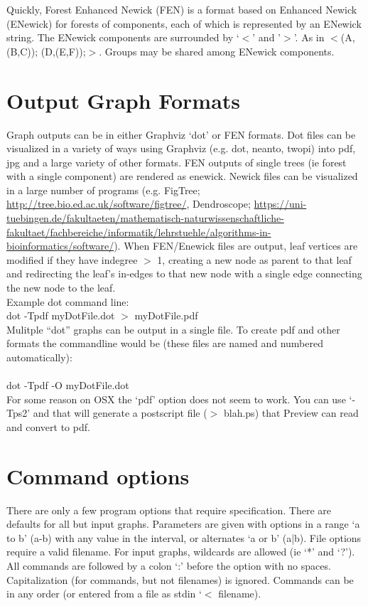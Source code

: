 \documentclass[11pt]{memoir}
\begin{document}
	Quickly, Forest Enhanced Newick (FEN) is a format based on Enhanced Newick (ENewick) for forests of components, each
	of which is represented by an ENewick string.  The ENewick components are surrounded by `$<$' and '$>$'.
	As in $<$(A, (B,C)); (D,(E,F));$>$.  Groups may be shared among ENewick components.
	
	
	\section{Output Graph Formats}
	Graph outputs can be in either Graphviz `dot' or FEN formats.  Dot files can be visualized in a variety of ways 
	using Graphviz (e.g. dot, neanto, twopi) into pdf, jpg and a large variety of other formats. FEN outputs of 
	single trees (ie forest with a single component) are rendered as enewick.  Newick files can be visualized in a 
	large number of programs (e.g. FigTree; \url{http://tree.bio.ed.ac.uk/software/figtree/}, Dendroscope; 
	\url{https://uni-tuebingen.de/fakultaeten/mathematisch-naturwissenschaftliche-fakultaet/fachbereiche/informatik/lehrstuehle/algorithms-in-bioinformatics/software/}). 	
	When FEN/Enewick files are output, leaf vertices are modified if they have indegree $>$ 1, creating a new node as parent to that leaf
	and redirecting the leaf's in-edges to that new node with a single edge connecting the new node to the leaf.  
	\bigskip
	\\Example dot command line: \\dot -Tpdf myDotFile.dot $>$ myDotFile.pdf\\
	
	Mulitple ``dot'' graphs can be output in a single file.  To create pdf and 
	other formats the commandline would be (these files are named and numbered automatically):\\\\dot -Tpdf -O myDotFile.dot\\
	
	For some reason on OSX the `pdf' option does not seem to work.  You can use `-Tps2' and that will generate a postscript file ($>$ blah.ps) that Preview can read and convert to pdf.
	
	\section{Command options}
	There are only a few program options that require specification.  There are defaults for all but input graphs.  
	Parameters are given with options in a range `a to b' (a-b) with any value in the interval, or alternates `a or b' (a|b). File options require a valid filename.
	For input graphs, wildcards are allowed (ie `*' and `?').  All commands are followed by a colon `:' before the option with no spaces.  Capitalization (for commands, but not filenames) is ignored.  Commands can be in any order (or entered from a file as stdin `$<$ filename).
	
\end{document}
